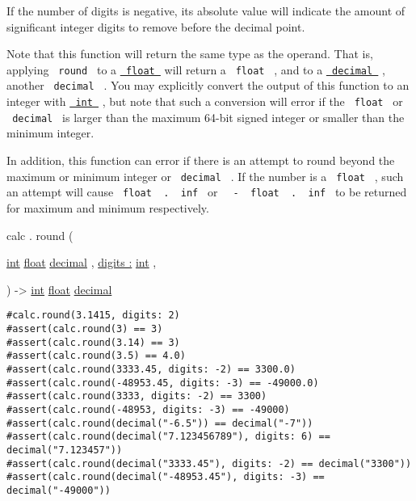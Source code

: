 If the number of digits is negative, its absolute value will indicate
the amount of significant integer digits to remove before the decimal
point.

Note that this function will return the same type as the operand. That
is, applying \texttt{\ round\ } to a
\href{/docs/reference/foundations/float/}{\texttt{\ float\ }} will
return a \texttt{\ float\ } , and to a
\href{/docs/reference/foundations/decimal/}{\texttt{\ decimal\ }} ,
another \texttt{\ decimal\ } . You may explicitly convert the output of
this function to an integer with
\href{/docs/reference/foundations/int/}{\texttt{\ int\ }} , but note
that such a conversion will error if the \texttt{\ float\ } or
\texttt{\ decimal\ } is larger than the maximum 64-bit signed integer or
smaller than the minimum integer.

In addition, this function can error if there is an attempt to round
beyond the maximum or minimum integer or \texttt{\ decimal\ } . If the
number is a \texttt{\ float\ } , such an attempt will cause
\texttt{\ float\ }{\texttt{\ .\ }}\texttt{\ inf\ } or
\texttt{\ }{\texttt{\ -\ }}\texttt{\ float\ }{\texttt{\ .\ }}\texttt{\ inf\ }
to be returned for maximum and minimum respectively.

calc { . } { round } (

{ \href{/docs/reference/foundations/int/}{int}
\href{/docs/reference/foundations/float/}{float}
\href{/docs/reference/foundations/decimal/}{decimal} , } {
\hyperref[functions-round-parameters-digits]{digits :}
\href{/docs/reference/foundations/int/}{int} , }

) -\textgreater{} \href{/docs/reference/foundations/int/}{int}
\href{/docs/reference/foundations/float/}{float}
\href{/docs/reference/foundations/decimal/}{decimal}

\begin{verbatim}
#calc.round(3.1415, digits: 2)
#assert(calc.round(3) == 3)
#assert(calc.round(3.14) == 3)
#assert(calc.round(3.5) == 4.0)
#assert(calc.round(3333.45, digits: -2) == 3300.0)
#assert(calc.round(-48953.45, digits: -3) == -49000.0)
#assert(calc.round(3333, digits: -2) == 3300)
#assert(calc.round(-48953, digits: -3) == -49000)
#assert(calc.round(decimal("-6.5")) == decimal("-7"))
#assert(calc.round(decimal("7.123456789"), digits: 6) == decimal("7.123457"))
#assert(calc.round(decimal("3333.45"), digits: -2) == decimal("3300"))
#assert(calc.round(decimal("-48953.45"), digits: -3) == decimal("-49000"))
\end{verbatim}

